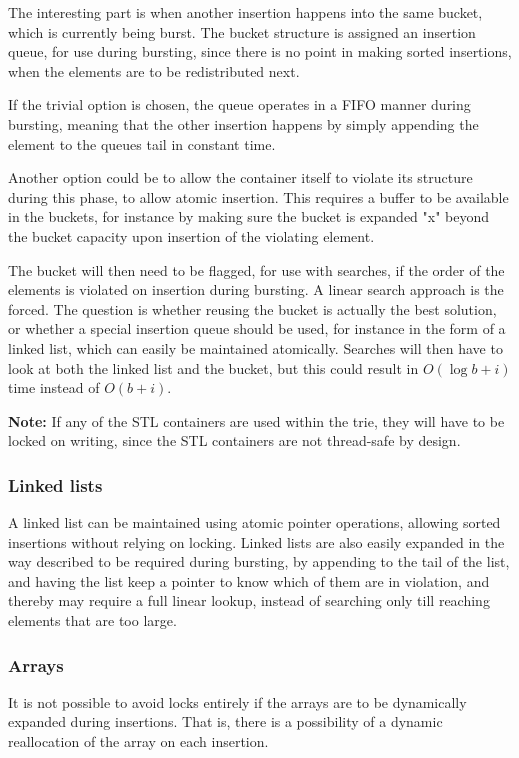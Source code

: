\documentclass[11pt,a4paper]{article}
\begin{document}
The interesting part is when another insertion happens into the same bucket,
which is currently being burst. The bucket structure is assigned an insertion
queue, for use during bursting, since there is no point in making sorted
insertions, when the elements are to be redistributed next.

If the trivial option is chosen, the queue
operates in a FIFO manner during bursting, meaning that the other insertion
happens by simply appending the element to the queues tail in constant time.

Another option could be to allow the container itself to violate its structure
during this phase, to allow atomic insertion.
This requires a buffer to be available in the buckets, for instance by making
sure the bucket is expanded "x" beyond the bucket capacity upon insertion of
the violating element.

The bucket will then need to be flagged, for use with searches, if the order of
the elements is violated on insertion during bursting. A linear search approach
is the forced. The question is whether reusing the bucket is actually the best
solution, or whether a special insertion queue should be used, for instance in
the form of a linked list, which can easily be maintained atomically. Searches
will then have to look at both the linked list and the bucket, but this could
result in $O(\log b + i)$ time instead of $O(b+i)$.

{\bf Note:} If any  of the STL containers are used within the trie, they will
have to be locked on writing, since the STL containers are not thread-safe by
design.

\subsubsection{Linked lists}
A linked list can be maintained using atomic pointer operations, allowing
sorted insertions without relying on locking.
Linked lists are also easily expanded in the way described to be required during
bursting, by appending to the tail of the list, and having the list keep a
pointer to know which of them are in violation, and thereby may require a
full linear lookup, instead of searching only till reaching elements that are
too large.

\subsubsection{Arrays}
It is not possible to avoid locks entirely if the arrays are to be dynamically
expanded during insertions. That is, there is a possibility of a dynamic
reallocation of the array on each insertion.
\end{document}
